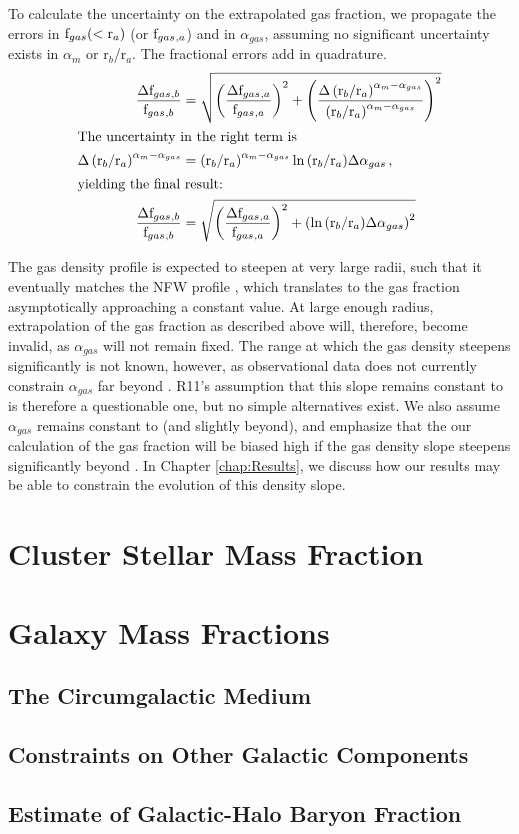 To calculate the uncertainty on the extrapolated gas fraction, we
propagate the errors in $\textrm{f\ensuremath{_{gas}}}(<\textrm{r}_a)$ (or $\textrm{f\ensuremath{_{gas}}}{}_{,a}$) and in
$\alpha_{gas}$, assuming no significant uncertainty exists in
$\alpha_m$ or r$_b$/r$_a$. The fractional errors add in quadrature.
\begin{align}
\frac{\Delta\textrm{f\ensuremath{_{gas}}}{}_{,b}}{\textrm{f\ensuremath{_{gas}}}{}_{,b}} &=
\sqrt{\left(\frac{\Delta\textrm{f\ensuremath{_{gas}}}{}_{,a}}{\textrm{f\ensuremath{_{gas}}}{}_{,a}}\right)^2 +
  \left(\frac{\Delta\left(\textrm{r}_b/\textrm{r}_a\right)^{\alpha_m-\alpha_{gas}}}{\left(\textrm{r}_b/\textrm{r}_a\right)^{\alpha_m-\alpha_{gas}}}\right)^2}\nonumber\\
\intertext{The uncertainty in the right term is}
\Delta\left(\textrm{r}_b/\textrm{r}_a\right)^{\alpha_m-\alpha_{gas}}
& =
\left(\textrm{r}_b/\textrm{r}_a\right)^{\alpha_m-\alpha_{gas}}\ln{\left(\textrm{r}_b/\textrm{r}_a\right)}\Delta\alpha_{gas}\,,\nonumber\\
\intertext{yielding the final result:}
\frac{\Delta\textrm{f\ensuremath{_{gas}}}{}_{,b}}{\textrm{f\ensuremath{_{gas}}}{}_{,b}} &=
\sqrt{\left(\frac{\Delta\textrm{f\ensuremath{_{gas}}}{}_{,a}}{\textrm{f\ensuremath{_{gas}}}{}_{,a}}\right)^2 +
  \left(\ln{\left(\textrm{r}_b/\textrm{r}_a\right)}\Delta\alpha_{gas}\right)^2}
\end{align}

The gas density profile is expected to steepen at very large radii,
such that it eventually matches the NFW profile ,
which translates to the gas fraction asymptotically approaching a constant
value. At large enough radius, extrapolation of the gas fraction as
described above will, therefore, become invalid, as $\alpha_{gas}$
will not remain fixed. The range at which the gas density steepens
significantly is not known, however, as observational data does not
currently constrain $\alpha_{gas}$ far beyond \rfive. R11's assumption
that this slope remains constant to \rvir{} is therefore a
questionable one, but no simple alternatives exist. We also assume
$\alpha_{gas}$ remains constant to \rvir{} (and slightly beyond), and
emphasize that the our calculation of the gas fraction will be biased
high if the gas density slope steepens significantly beyond
\rfive{}. In Chapter \ref{chap:Results}, we discuss how our results
may be able to constrain the evolution of this density slope. 

\section{Cluster Stellar Mass Fraction}
\label{sec:Stellar}

\section{Galaxy Mass Fractions}
\label{sec:Galaxy}

\subsection{The Circumgalactic Medium}
\label{sec:Galaxy.CGM}

\subsection{Constraints on Other Galactic Components}
\label{sec:Galaxy.Components}

\subsection{Estimate of Galactic-Halo Baryon Fraction}
\label{sec:Galaxy.Fraction}
